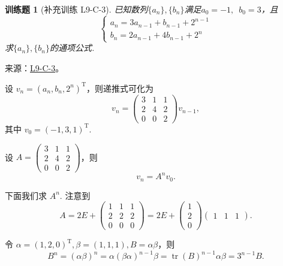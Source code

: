 \documentclass[UTF8,12pt,a4paper,fontset=fandol]{ctexart}
\newtheorem{exercise}{训练题}[section]
\begin{document}
\begin{exercise}[补充训练 L9-C-3]\label{prob:L9-C-3}
已知数列$\{a_n\},\{b_n\}$满足$a_0=-1,\enspace b_0=3$，且
        \[\begin{cases}
                a_n=3a_{n-1}+b_{n-1}+2^{n-1} \\
                b_n=2a_{n-1}+4b_{n-1}+2^n
            \end{cases}\]
        求$\{a_n\},\{b_n\}$的通项公式.
\end{exercise}
\noindent 来源：\href{https://github.com/yhwu-is/Linear-Algebra-Left-Undone/blob/new/%E8%AE%B2%E4%B9%89/%E4%B8%93%E9%A2%98/9%20%E7%9F%A9%E9%98%B5%E8%BF%90%E7%AE%97%E8%BF%9B%E9%98%B6.tex}{L9-C-3}。
\begin{solve}
设 $v_n = (a_n, b_n, 2^n)^\mathrm{T}$，则递推式可化为
            \[
                v_n = \begin{pmatrix}
                    3 & 1 & 1 \\ 2 & 4 & 2 \\ 0 & 0 & 2
                \end{pmatrix} v_{n-1},
            \]
            其中 $v_0 = (-1, 3, 1)^\mathrm{T}$.

            设 $A = \begin{pmatrix}
                3 & 1 & 1 \\ 2 & 4 & 2 \\ 0 & 0 & 2
            \end{pmatrix}$，则
            \[
                v_n = A^n v_0.
            \]

            下面我们求 $A^n$. 注意到
            \[
                A = 2E + \begin{pmatrix}
                    1 & 1 & 1 \\ 2 & 2 & 2 \\ 0 & 0 & 0
                  \end{pmatrix}
                  = 2E + \begin{pmatrix}
                      1 \\ 2 \\ 0
                  \end{pmatrix} \begin{pmatrix}
                      1 & 1 & 1
                  \end{pmatrix}.
            \]

            令 $\alpha = (1, 2, 0)^\mathrm{T}, \beta = (1, 1, 1), B=\alpha \beta$，则
            \[
                B^n = \left( \alpha \beta \right)^n = \alpha \left( \beta \alpha \right)^{n-1} \beta = \operatorname{tr}(B)^{n-1} \alpha \beta = 3^{n-1} B.
            \]


\end{solve}
\end{document}
